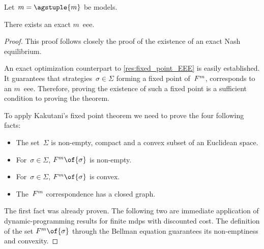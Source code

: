 \begin{theorem}
\label{res:eee_existence}
Let~\(m = \agstuple{m}\) be models.

There exists an exact \(m\)~\ac{eee}.
\end{theorem}

\begin{proof}
This proof follows closely the proof of the existence of an exact Nash equilibrium.

An exact optimization counterpart to \cref{res:fixed_point_EEE} is easily established.
It guarantees that strategies~\(\sigma \in \Sigma\) forming a fixed point of~\(F^{m}\), corresponds to an \(m\)~\ac{eee}.
Therefore, proving the existence of such a fixed point is a sufficient condition to proving the theorem.

To apply Kakutani's fixed point theorem we need to prove the four following facts:
\begin{itemize}
\item The set~\(\Sigma\) is non-empty, compact and a convex subset of an Euclidean space.
\item For~\(\sigma \in \Sigma\), \(\FF \of {\sigma}\) is non-empty.
\item For~\(\sigma \in \Sigma\), \(\FF \of {\sigma}\) is convex.
\item The~\(F^{m}\) correspondence has a closed graph.
\end{itemize}

The first fact was already proven.
The following two are immediate application of dynamic-programming results for finite \acp{mdp} with discounted cost.
The definition of the set \(\FF \of {\sigma}\) through the Bellman equation guarantees its non-emptiness and convexity.


\end{proof}
